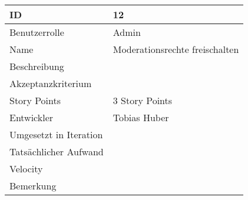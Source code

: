 \begin{tabularx}{\textwidth}{|p{}|X|}
	\hline
	ID & 12\\
	\hline
	Benutzerrolle & Admin\\
	\hline
	Name & Moderationsrechte freischalten\\
	\hline
	Beschreibung & \\
	\hline
	Akzeptanzkriterium & \\
	\hline
	Story Points & 3 Story Points\\
	\hline
	Entwickler & Tobias Huber\\
	\hline
	Umgesetzt in Iteration & \\
	\hline
	Tatsächlicher Aufwand & \\
	\hline
	Velocity & \\
	\hline
	Bemerkung & \\
	\hline
\end{tabularx}
\vspace{20pt}
